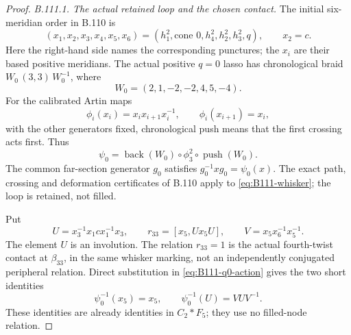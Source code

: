 \begin{proof}
\emph{B.111.1. The actual retained loop and the chosen contact.}
The initial six-meridian order in B.110 is
\[
 (x_1,x_2,x_3,x_4,x_5,x_6)
 =(h_1^2,\text{cone }0,h_4^2,h_2^2,h_3^2,q),
 \qquad x_2=c.
\]
Here the right-hand side names the corresponding punctures; the
$x_i$ are their based positive meridians.
The actual positive $q=0$ lasso has chronological braid
$W_0\,(3,3)\,W_0^{-1}$, where
\begin{equation}\label{eq:B111-whisker}
 W_0=(2,1,-2,-2,4,5,-4).
\end{equation}
For the calibrated Artin maps
\[
 \phi_i(x_i)=x_i x_{i+1}x_i^{-1},\qquad
 \phi_i(x_{i+1})=x_i,
\]
with the other generators fixed, chronological push means that the
first crossing acts first.  Thus
\begin{equation}\label{eq:B111-q0-action}
 \psi_0=\operatorname{back}(W_0)\circ\phi_3^2
                    \circ\operatorname{push}(W_0).
\end{equation}
The common far-section generator $g_0$ satisfies
$g_0^{-1}xg_0=\psi_0(x)$.
The exact path, crossing and deformation certificates of B.110
apply to \eqref{eq:B111-whisker}; the loop is retained, not filled.

Put
\begin{equation}\label{eq:B111-raw-contact}
 U=x_3^{-1}x_1c x_1^{-1}x_3,
 \qquad r_{33}=[x_5,Ux_5U],
 \qquad V=x_5x_6^{-1}x_5^{-1}.
\end{equation}
The element $U$ is an involution.  The relation $r_{33}=1$ is the
actual fourth-twist contact at $\beta_{33}$, in the same whisker
marking, not an independently conjugated peripheral relation.
Direct substitution in \eqref{eq:B111-q0-action} gives the two short
identities
\begin{equation}\label{eq:B111-inverse-images}
 \psi_0^{-1}(x_5)=x_5,
 \qquad \psi_0^{-1}(U)=VUV^{-1}.
\end{equation}
These identities are already identities in $C_2*F_5$; they use no
filled-node relation.


\end{proof}
